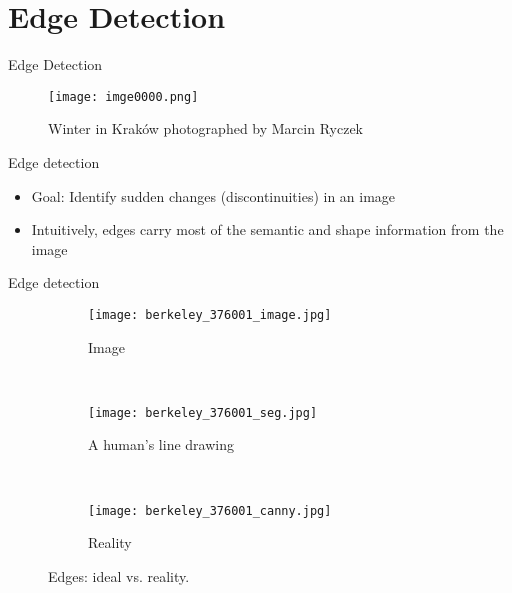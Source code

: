 \section{Edge Detection}
\begin{frame}{Edge Detection}
    \begin{figure}
        \centering
        \texttt{[image: imge0000.png]}
        \caption{Winter in Krak{\'o}w photographed by Marcin Ryczek}\label{fi:ryczek}
    \end{figure}
\end{frame}


\begin{frame}{Edge detection}
    \begin{itemize}
    \item Goal:  Identify sudden changes (discontinuities) in an image
    \item Intuitively, edges carry most of the semantic and shape information from the image
    \end{itemize}
    {
        \centering
        
    }
\end{frame}


\begin{frame}{Edge detection}
    \begin{figure}[ht]
      \centering
      \begin{subfigure}[b]{0.3\textwidth}
        \centering\texttt{[image: berkeley\_376001\_image.jpg]}
        \caption{Image}\label{sf:galn}
      \end{subfigure}%
      ~   
      \begin{subfigure}[b]{0.3\textwidth}
        \centering\texttt{[image: berkeley\_376001\_seg.jpg]}
        \caption{A human's line drawing}\label{sf:galn}
      \end{subfigure}%
      ~
      \begin{subfigure}[b]{0.3\textwidth}
        \centering\texttt{[image: berkeley\_376001\_canny.jpg]}
        \caption{Reality}\label{sf:galb}
      \end{subfigure}
      \caption{Edges: ideal vs. reality.}
    \end{figure}

\end{frame}



